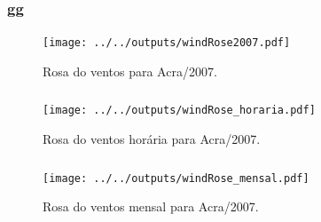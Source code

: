 \begin{frame}
  \frametitle{gg}
  \begin{figure}[H]
    \centering
    \texttt{[image: ../../outputs/windRose2007.pdf]}
    \caption{Rosa do ventos para Acra/2007. \label{fg:rosaCompleta}}
  \end{figure}
\end{frame}


\begin{frame}
  \frametitle{}
  \begin{figure}[H]
    \centering
    \texttt{[image: ../../outputs/windRose\_horaria.pdf]}
    \caption{Rosa do ventos horária para Acra/2007. \label{fig:windRose_horaria}}
  \end{figure}
\end{frame}


\begin{frame}
  \frametitle{}
  \begin{figure}[H]
    \centering
    \texttt{[image: ../../outputs/windRose\_mensal.pdf]}
    \caption{Rosa do ventos mensal para Acra/2007. \label{fig:windRose_mensal}}
  \end{figure}
\end{frame}



